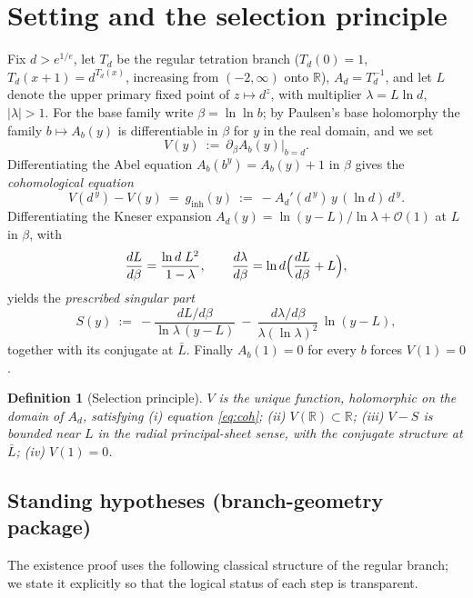 \documentclass[11pt]{article}
\newtheorem{definition}[theorem]{Definition}
\newcommand{\R}{\mathbb{R}}
\begin{document}
\section{Setting and the selection principle}

Fix $d>e^{1/e}$, let $T_d$ be the regular tetration branch
($T_d(0)=1$, $T_d(x+1)=d^{T_d(x)}$, increasing from $(-2,\infty)$ onto
$\R$), $A_d=T_d^{-1}$, and let $L$ denote the upper primary fixed point of
$z\mapsto d^z$, with multiplier $\lambda=L\ln d$, $|\lambda|>1$.  For the
base family write $\beta=\ln\ln b$; by Paulsen's base holomorphy
\cite{p19} the family $b\mapsto A_b(y)$ is differentiable in $\beta$ for
$y$ in the real domain, and we set
\[
  V(y)\ :=\ \partial_\beta A_b(y)\big|_{b=d}.
\]
Differentiating the Abel equation $A_b(b^y)=A_b(y)+1$ in $\beta$ gives the
\emph{cohomological equation}
\begin{equation}\label{eq:coh}
  V(d^{\,y})-V(y)\ =\ g_{\mathrm{inh}}(y)\ :=\ -A_d'(d^{\,y})\,y\,(\ln d)\,d^{\,y}.
\end{equation}
Differentiating the Kneser expansion
$A_d(y)=\ln(y-L)/\ln\lambda+\mathcal O(1)$ at $L$ in $\beta$, with
\begin{equation}\label{eq:dL}
  \frac{dL}{d\beta}=\frac{\ln d\;L^2}{1-\lambda},
  \qquad
  \frac{d\lambda}{d\beta}=\ln d\Bigl(\frac{dL}{d\beta}+L\Bigr),
\end{equation}
yields the \emph{prescribed singular part}
\begin{equation}\label{eq:S}
  S(y)\ :=\ -\frac{dL/d\beta}{\ln\lambda\,(y-L)}
          \ -\ \frac{d\lambda/d\beta}{\lambda(\ln\lambda)^2}\,\ln(y-L),
\end{equation}
together with its conjugate at $\bar L$.  Finally $A_b(1)=0$ for every $b$
forces $V(1)=0$.

\begin{definition}[Selection principle]\label{def:selection}
$V$ is the unique function, holomorphic on the domain of $A_d$, satisfying
(i) equation \eqref{eq:coh}; (ii) $V(\R)\subset\R$; (iii) $V-S$ is bounded
near $L$ in the radial principal-sheet sense, with the conjugate structure
at $\bar L$; (iv) $V(1)=0$.
\end{definition}

\subsection*{Standing hypotheses (branch-geometry package)}

The existence proof uses the following classical structure of the regular
branch; we state it explicitly so that the logical status of each step is
transparent.
\end{document}
